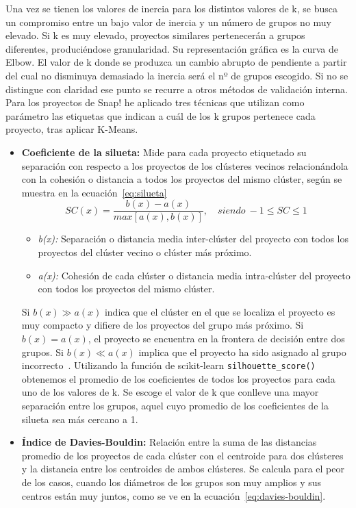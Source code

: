 \documentclass[a4paper, 12pt]{book}
\begin{document}
Una vez se tienen los valores de inercia para los distintos valores de k, se busca un compromiso entre un bajo valor de inercia y un número de grupos no muy elevado. Si k es muy elevado, proyectos similares pertenecerán a grupos diferentes, produciéndose granularidad. Su representación gráfica es la curva de Elbow. El valor de k donde se produzca un cambio abrupto de pendiente a partir del cual no disminuya demasiado la inercia será el nº de grupos escogido. Si no se distingue con claridad ese punto se recurre a otros métodos de validación interna. Para los proyectos de Snap! he aplicado tres técnicas que utilizan como parámetro las etiquetas que indican a cuál de los k grupos pertenece cada proyecto, tras aplicar K-Means. 

\begin{itemize}
    \item \textbf{Coeficiente de la silueta:} Mide para cada proyecto etiquetado su separación con respecto a los proyectos de los clústeres vecinos relacionándola con la cohesión o distancia a todos los proyectos del mismo clúster, según se muestra en la ecuación~\eqref{eq:silueta}
    \begin{equation}
        SC(x)=\frac {b(x)-a(x)}{max[a(x),b(x)]},\quad\mathit{siendo}\ -1\leq SC \leq1
        \label{eq:silueta}
    \end{equation}   
    \begin{itemize}
        \item \emph{b(x):} Separación o distancia media inter-clúster del proyecto con todos los proyectos del clúster vecino o clúster más próximo.
        \item \emph{a(x):} Cohesión de cada clúster o distancia media intra-clúster del proyecto con todos los proyectos del mismo clúster.
    \end{itemize}
    Si $b(x)\gg a(x)$ indica que el clúster en el que se localiza el proyecto es muy compacto y difiere de los proyectos del grupo más próximo. Si $b(x)= a(x)$, el proyecto se encuentra en la frontera de decisión entre dos grupos. Si $b(x)\ll a(x)$ implica que el proyecto ha sido asignado al grupo incorrecto~\cite{rousseeuv_87}. Utilizando la función de scikit-learn \texttt{silhouette\_score()} obtenemos el promedio de los coeficientes de todos los proyectos para cada uno de los valores de k. Se escoge el valor de k que conlleve una mayor separación entre los grupos, aquel cuyo promedio de los coeficientes de la silueta sea más cercano a 1. 
    \item \textbf{Índice de Davies-Bouldin:} Relación entre la suma de las distancias promedio de los proyectos de cada clúster con el centroide para dos clústeres y la distancia entre los centroides de ambos clústeres. Se calcula para el peor de los casos, cuando los diámetros de los grupos son muy amplios y sus centros están muy juntos, como se ve en la ecuación~\eqref{eq:davies-bouldin}. 

\end{itemize}
\end{document}
